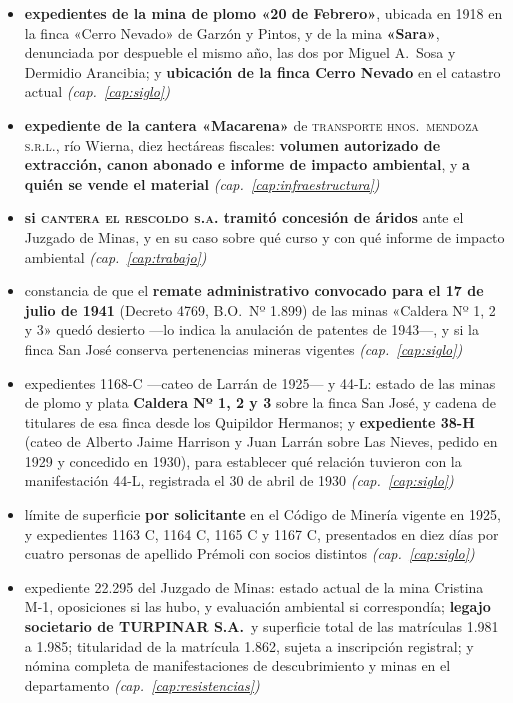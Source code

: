 \begin{itemize}[leftmargin=*]
\item \textbf{expedientes de la mina de plomo «20 de Febrero»}, ubicada en 1918 en la finca «Cerro Nevado» de Garzón y Pintos, y de la mina \textbf{«Sara»}, denunciada por despueble el mismo año, las dos por Miguel A.\ Sosa y Dermidio Arancibia; y \textbf{ubicación de la finca Cerro Nevado} en el catastro actual \textit{(cap.\ \ref{cap:siglo})}

\item \textbf{expediente de la cantera «Macarena»} de \textsc{transporte hnos.\ mendoza s.r.l.}, río Wierna, diez hectáreas fiscales: \textbf{volumen autorizado de extracción, canon abonado e informe de impacto ambiental}, y \textbf{a quién se vende el material} \textit{(cap.\ \ref{cap:infraestructura})}
\item \textbf{si \textsc{cantera el rescoldo s.a.} tramitó concesión de áridos} ante el Juzgado de Minas, y en su caso sobre qué curso y con qué informe de impacto ambiental \textit{(cap.\ \ref{cap:trabajo})}
\item constancia de que el \textbf{remate administrativo convocado para el 17 de julio de 1941} (Decreto 4769, B.O.\ Nº 1.899) de las minas «Caldera Nº 1, 2 y 3» quedó desierto ---lo indica la anulación de patentes de 1943---, y si la finca San José conserva pertenencias mineras vigentes \textit{(cap.\ \ref{cap:siglo})}
\item expedientes 1168-C ---cateo de Larrán de 1925--- y 44-L: estado de las minas de plomo y plata \textbf{Caldera Nº 1, 2 y 3} sobre la finca San José, y cadena de titulares de esa finca desde los Quipildor Hermanos; y \textbf{expediente 38-H} (cateo de Alberto Jaime Harrison y Juan Larrán sobre Las Nieves, pedido en 1929 y concedido en 1930), para establecer qué relación tuvieron con la manifestación 44-L, registrada el 30 de abril de 1930 \textit{(cap.\ \ref{cap:siglo})}
\item límite de superficie \textbf{por solicitante} en el Código de Minería vigente en 1925, y expedientes 1163 C, 1164 C, 1165 C y 1167 C, presentados en diez días por cuatro personas de apellido Prémoli con socios distintos \textit{(cap.\ \ref{cap:siglo})}
\item expediente 22.295 del Juzgado de Minas: estado actual de la mina Cristina M-1, oposiciones si las hubo, y evaluación ambiental si correspondía; \textbf{legajo societario de TURPINAR S.A.}\ y superficie total de las matrículas 1.981 a 1.985; titularidad de la matrícula 1.862, sujeta a inscripción registral; y nómina completa de manifestaciones de descubrimiento y minas en el departamento \textit{(cap.\ \ref{cap:resistencias})}

\end{itemize}
